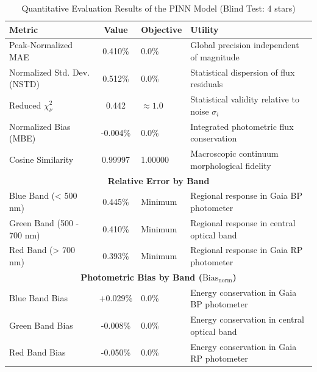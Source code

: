 
\begin{table}[htpb]
\centering
\caption{Quantitative Evaluation Results of the PINN Model (Blind Test: 4 stars)}
\label{tab:pinn_evaluation}
\begin{tabular}{lcll}
\hline
\textbf{Metric} & \textbf{Value} & \textbf{Objective} & \textbf{Utility} \\
\hline
Peak-Normalized MAE & 0.410\% & 0.0\% & Global precision independent of magnitude \\
Normalized Std. Dev. (NSTD) & 0.512\% & 0.0\% & Statistical dispersion of flux residuals \\
Reduced $\chi^2_\nu$ & 0.442 & $\approx 1.0$ & Statistical validity relative to noise $\sigma_i$ \\
Normalized Bias (MBE) & -0.004\% & 0.0\% & Integrated photometric flux conservation \\
Cosine Similarity & 0.99997 & 1.00000 & Macroscopic continuum morphological fidelity \\
\hline
\multicolumn{4}{c}{\textbf{Relative Error by Band}} \\
\hline
Blue Band (< 500 nm) & 0.445\% & Minimum & Regional response in Gaia BP photometer \\
Green Band (500 - 700 nm) & 0.410\% & Minimum & Regional response in central optical band \\
Red Band (> 700 nm) & 0.393\% & Minimum & Regional response in Gaia RP photometer \\
\hline
\multicolumn{4}{c}{\textbf{Photometric Bias by Band ($\text{Bias}_{\text{norm}}$)}} \\
\hline
Blue Band Bias & +0.029\% & 0.0\% & Energy conservation in Gaia BP photometer \\
Green Band Bias & -0.008\% & 0.0\% & Energy conservation in central optical band \\
Red Band Bias & -0.050\% & 0.0\% & Energy conservation in Gaia RP photometer \\
\hline
\end{tabular}
\end{table}
